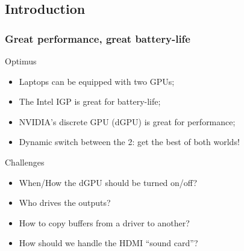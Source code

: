 \documentclass[11pt,english,compress]{beamer}
\begin{document}
\subsection{Introduction}
\begin{frame}
	\frametitle{Great performance, great battery-life}

	\begin{block}{Optimus}
		\begin{itemize}
			\item Laptops can be equipped with two GPUs;
			\item The Intel IGP is great for battery-life;
			\item NVIDIA's discrete GPU (dGPU) is great for performance;
			\item Dynamic switch between the 2: get the best of both worlds!
		\end{itemize}
	\end{block}

	\begin{block}{Challenges}
		\begin{itemize}
			\item When/How the dGPU should be turned on/off?
			\item Who drives the outputs?
			\item How to copy buffers from a driver to another?
			\item How should we handle the HDMI ``sound card''?
		\end{itemize}
	\end{block}
\end{frame}
\end{document}

